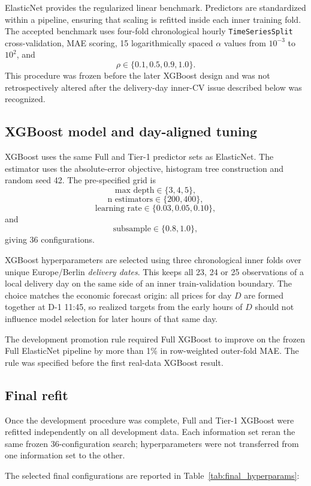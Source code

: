 ElasticNet provides the regularized linear benchmark. Predictors are standardized within a pipeline, ensuring that scaling is refitted inside each inner training fold. The accepted benchmark uses four-fold chronological hourly \texttt{TimeSeriesSplit} cross-validation, MAE scoring, 15 logarithmically spaced \(\alpha\) values from \(10^{-3}\) to \(10^2\), and
\[
\rho\in\{0.1,0.5,0.9,1.0\}.
\]
This procedure was frozen before the later XGBoost design and was not retrospectively altered after the delivery-day inner-CV issue described below was recognized.

\subsection{XGBoost model and day-aligned tuning}

XGBoost uses the same Full and Tier-1 predictor sets as ElasticNet. The estimator uses the absolute-error objective, histogram tree construction and random seed 42. The pre-specified grid is
\[
\text{max depth}\in\{3,4,5\},
\]
\[
\text{n estimators}\in\{200,400\},
\]
\[
\text{learning rate}\in\{0.03,0.05,0.10\},
\]
and
\[
\text{subsample}\in\{0.8,1.0\},
\]
giving 36 configurations.

XGBoost hyperparameters are selected using three chronological inner folds over unique Europe/Berlin \emph{delivery dates}. This keeps all 23, 24 or 25 observations of a local delivery day on the same side of an inner train-validation boundary. The choice matches the economic forecast origin: all prices for day \(D\) are formed together at D-1 11:45, so realized targets from the early hours of \(D\) should not influence model selection for later hours of that same day.

The development promotion rule required Full XGBoost to improve on the frozen Full ElasticNet pipeline by more than 1\% in row-weighted outer-fold MAE. The rule was specified before the first real-data XGBoost result.

\subsection{Final refit}

Once the development procedure was complete, Full and Tier-1 XGBoost were refitted independently on all development data. Each information set reran the same frozen 36-configuration search; hyperparameters were not transferred from one information set to the other.

The selected final configurations are reported in Table~\ref{tab:final_hyperparams}:

